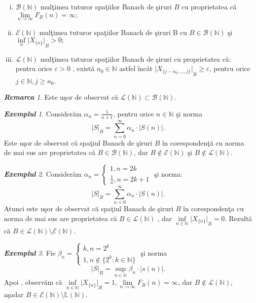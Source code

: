 \documentclass[ a4paper, 12pt]{report}
\theoremstyle{definition}
\theoremstyle{remark}
\newtheorem{remarc}{\bf Remarca}[section]
\newtheorem{exemple}{\bf Exemplul}[section]
\numberwithin{equation}{section}
\begin{document}
\begin{enumerate}[(i)]
\item $\mathcal{B}(\mathbb{N})$ mul\c timea tuturor spa\c tiilor Banach de \c siruri $B$ cu proprietatea c\u a $\lim\limits_{n \rightarrow \infty} F_B(n)=\infty;$
\item $\mathcal{E}(\mathbb{N})$ mul\c timea tuturor spa\c tiilor Banach de \c siruri B cu $B \in \mathcal{B}(\mathbb{N})$ \c si $\inf\limits_{n}{\lvert X_{\{n\}} \rvert}_B>0;$
\item $\mathcal{L}(\mathbb{N})$ mul\c timea tuturor spa\c tiilor Banach de \c siruri cu proprietatea c\u a:
pentru orice $\varepsilon>0$ , exist\u a $n_0 \in \mathbb{N}$ astfel \^inc\^at ${\lvert X_{\{j-n_0,...,j\}} \rvert}_B \geq \varepsilon $, pentru orice $j \in \mathbb{N} , j \geq n_0$.
\end{enumerate}
\begin{remarc}\label{rer}
Este u\c sor de observat c\u a $\mathcal{L}(\mathbb{N})\subset \mathcal{B}(\mathbb{N})$.
\end{remarc}
\begin{exemple}
Consider\u am $\alpha_n=\frac{1}{n+1}$, pentru orice $n \in \mathbb{N}$ \c si norma 
\[{\lvert S \rvert}_B=\sum\limits_{n=0}^{\infty}{\alpha_n \cdot \lvert S(n) \rvert}.\]
Este u\c sor de observat c\u a spa\c tiul Banach de \c siruri $B$ \^in coresponden\c t\u a cu norma de mai sus are proprietatea c\u a $B \in \mathcal{B}(\mathbb{N})$, dar $B \notin \mathcal{E}(\mathbb{N})$ \c si $B \notin \mathcal{L}(\mathbb{N})$.
\end{exemple}
\begin{exemple}
Consider\u am $\alpha_n=
\begin{cases}
1,n=2k\\
\frac{1}{n},n=2k+1
\end{cases}$ \c si norma:\\
\[{\lvert S \rvert}_B=\sum\limits_{n=0}^{\infty}{\alpha_n \cdot \lvert S(n) \rvert}.\]
 Atunci este u\c sor de observat c\u a spa\c tiul Banach de \c siruri $B$ \^in coresponden\c ta cu norma de mai sus are proprietatea c\u a $B \in \mathcal{L}(\mathbb{N})$ , dar $\inf\limits_{n \in \mathbb{N}}{{\lvert X_{\{n\}} \rvert}_B}=0$. Rezult\u a c\u a $B \in \mathcal{L}(\mathbb{N}) \setminus \mathcal{E}(\mathbb{N})$.
\end{exemple}
\begin{exemple}
Fie $\beta_n=
\begin{cases}
k,n=2^k\\
1,n \notin \{2^k:k \in \mathbb{N}\}
\end{cases}$ \c si norma 
\[{\lvert S \rvert}_B=\sup\limits_{n \in \mathbb{N}}{\beta_n \cdot \lvert s(n) \rvert}.\]
Apoi , observ\u am c\u a $\inf\limits_{n \in \mathbb{N}}{\lvert X_{\{n\}}\rvert}_B=1,\lim\limits_{n \rightarrow \infty} F_B(n)=\infty$, dar $B \notin \mathcal{L}(\mathbb{N})$, a\c sadar $B \in \mathcal{E}(\mathbb{N}) \setminus \mathbb{L}(\mathbb{N})$.
\end{exemple}
\end{document}
